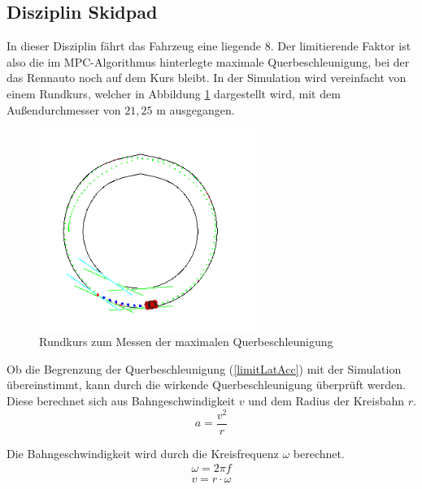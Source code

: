 \documentclass{like}
\begin{document}
\subsection{Disziplin Skidpad}
In dieser Disziplin fährt das Fahrzeug eine liegende 8. Der limitierende Faktor ist also die im \ac{MPC}-Algorithmus hinterlegte maximale Querbeschleunigung, bei der das Rennauto noch auf dem Kurs bleibt. In der Simulation wird vereinfacht von einem Rundkurs, welcher in Abbildung \ref{fig:roundCourse} dargestellt wird, mit dem Außendurchmesser von $21,25$ m ausgegangen. 
\begin{figure}
	\centering
	\includegraphics[width=200pt]{Abbildungen/roundCourse.png}
	\caption{Rundkurs zum Messen der maximalen Querbeschleunigung}
	\label{fig:roundCourse}
\end{figure}
Ob die Begrenzung der Querbeschleunigung (\ref{limitLatAcc}) mit der Simulation übereinstimmt, kann durch die wirkende Querbeschleunigung überprüft werden.
Diese berechnet sich aus Bahngeschwindigkeit $v$ und dem Radius der Kreisbahn $r$. 
\begin{equation}
	a = \frac{v^2}{r}
\end{equation}

Die Bahngeschwindigkeit wird durch die Kreisfrequenz $\omega$ berechnet.
\begin{eqnarray}
	 \omega = 2 \pi f \\
	 v = r \cdot \omega
\end{eqnarray}
\end{document}
